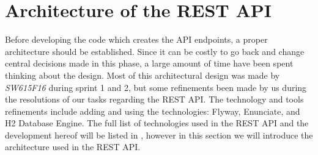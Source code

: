 \section{Architecture of the REST API}\label{sec:architecture}
Before developing the code which creates the API endpoints, a proper architecture should be established.
Since it can be costly to go back and change central decisions made in this phase, a large amount of time have been spent thinking about the design.
Most of this architectural design was made by \textit{SW615F16} during sprint 1 and 2, but some refinements been made by us during the resolutions of our tasks regarding the REST API.
The technology and tools refinements include adding and using the technologies: Flyway, Enunciate, and H2 Database Engine.
The full list of technologies used in the REST API and the development hereof will be listed in , however in this section we will introduce the architecture used in the REST API.

